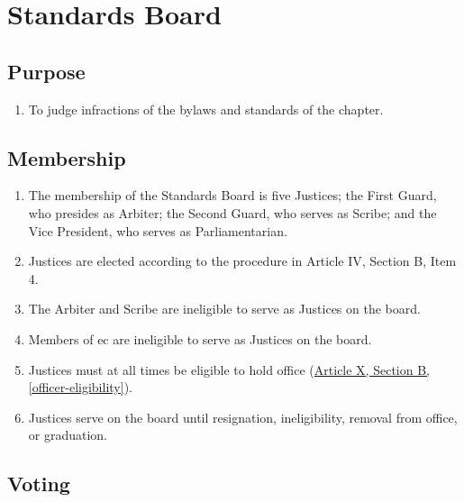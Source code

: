 \chapter{Standards Board}
\label{stds-board}

\section{Purpose}
	\begin{enumerate}
		\item To judge infractions of the bylaws and standards of the chapter.
	\end{enumerate}

\section{Membership}

	\begin{enumerate}
		\item The membership of the Standards Board is five Justices; the First Guard, who presides as Arbiter; the Second Guard, who serves as Scribe; and the Vice President, who serves as Parliamentarian.
        \item Justices are elected according to the procedure in Article IV, Section B, Item 4.
        \item The Arbiter and Scribe are ineligible to serve as Justices on the board.
		\item Members of \gls{ec} are ineligible to serve as Justices on the board.
		\item Justices must at all times be eligible to hold office (\hyperref[officer-eligibility]{Article X, Section B, \autoref*{officer-eligibility}}).
		\item Justices serve on the board until resignation, ineligibility, removal from office, or graduation. \label{justice-term}
	\end{enumerate}

\section{Voting}

